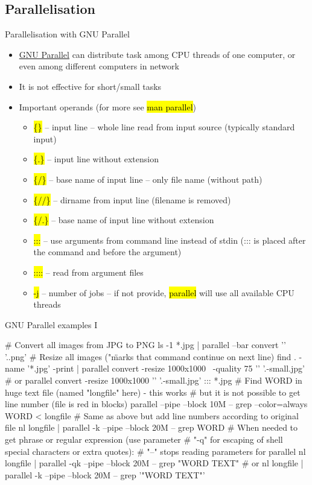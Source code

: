 \documentclass[compress, ucs, xelatex, 11pt, xcolor=svgnames,
  hyperref={
    bookmarks=true,
    unicode=true,
    colorlinks=true,
    pdftitle={Linux, command line and MetaCentrum},
    plainpages=false,
    pdfauthor={Vojtech Zeisek},
    pdfsubject={Course about use of Linux command line, writing shell scripts and using MetaCentrum of CESNET},
    pdfcreator={XeLaTeX},
    pdfkeywords={Linux, GNU, BASH, shell, command line, MetaCentrum},
    linkcolor=DarkRed,
    anchorcolor=DarkBlue,
    citecolor=Indigo,
    filecolor=NavyBlue,
    menucolor=DarkMagenta,
    urlcolor=DarkBlue,
    pdftex},
  url={hyphens, lowtilde} %
  ]{beamer}
\renewcommand{\texttt}[1]{\hl{\ttfamily #1}}
\begin{document}
\subsection{Parallelisation}

\begin{frame}{Parallelisation with GNU Parallel}
\begin{itemize}
  \item \href{https://www.gnu.org/software/parallel/}{GNU Parallel} can distribute task among CPU threads of one computer, or even among different computers in network
  \item It is not effective for short/small tasks
  \item Important operands (for more see \texttt{man parallel})
  \begin{itemize}
    \item \texttt{\{\}} -- input line -- whole line read from input source (typically standard input)
    \item \texttt{\{.\}} -- input line without extension
    \item \texttt{\{/\}} -- base name of input line -- only file name (without path)
    \item \texttt{\{//\}} -- dirname from input line (filename is removed)
    \item \texttt{\{/.\}} -- base name of input line without extension
    \item \texttt{:::} -- use arguments from command line instead of stdin (::: is placed after the command and before the argument)
    \item \texttt{::::} -- read from argument files
    \item \texttt{-j} -- number of jobs -- if not provide, \texttt{parallel} will use all available CPU threads
  \end{itemize}
\end{itemize}
\end{frame}

\begin{frame}[fragile]{GNU Parallel examples I}
  \begin{bashcode}
    # Convert all images from JPG to PNG
    ls -1 *.jpg | parallel --bar convert '{}' '{.}.png'
    # Resize all images ("\" marks that command continue on next line)
    find . -name '*.jpg' -print | parallel convert -resize 1000x1000 \
      -quality 75 '{}' '{.}-small.jpg' # or
    parallel convert -resize 1000x1000 '{}' '{.}-small.jpg' ::: *.jpg
    # Find WORD in huge text file (named "longfile" here) - this works
    # but it is not possible to get line number (file is red in blocks)
    parallel --pipe --block 10M -- grep --color=always WORD < longfile
    # Same as above but add line numbers according to original file
    nl longfile | parallel -k --pipe --block 20M -- grep WORD
    # When needed to get phrase or regular expression (use parameter
    # "-q" for escaping of shell special characters or extra quotes):
    # "--" stops reading parameters for parallel
    nl longfile | parallel -qk --pipe --block 20M -- grep "WORD TEXT" # or
    nl longfile | parallel -k --pipe --block 20M -- grep '"WORD TEXT"'
  \end{bashcode}
\end{frame}
\end{document}

